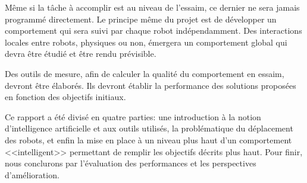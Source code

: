 Même si la tâche à accomplir est au niveau de l'essaim, ce dernier ne sera jamais programmé directement. Le principe même du projet est de développer un comportement qui sera suivi par chaque robot indépendamment. Des interactions locales entre robots, physiques ou non, émergera un comportement global qui devra être étudié et être rendu prévisible.

Des outils de mesure, afin de calculer la qualité du comportement en essaim, devront être élaborés. Ils devront établir la performance des solutions proposées en fonction des objectifs initiaux.~\cite{cahierCharges}

\vspace{1em}Ce rapport a été divisé en quatre parties: une introduction à la notion d'intelligence artificielle et aux outils utilisés, la problématique du déplacement des robots, et enfin la mise en place à un niveau plus haut d'un comportement <<intelligent>> permettant de remplir les objectifs décrits plus haut. Pour finir, nous conclurons par l'évaluation des performances et les perspectives d'amélioration.
